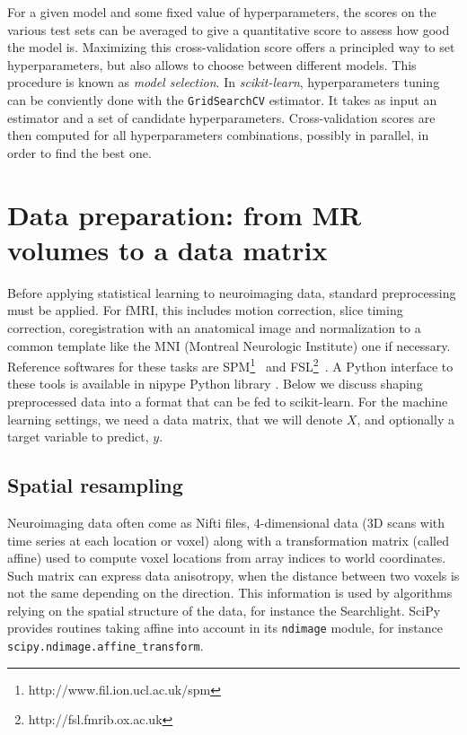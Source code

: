 \documentclass{frontiersSCNS} %
\begin{document}
For a given model and some fixed value of hyperparameters, the scores
on the various test sets can be averaged to give a quantitative score
to assess how good the model is. Maximizing this cross-validation score offers
a principled way to set hyperparameters, but also allows to choose between
different models. This procedure is known as \emph{model selection}.
%
In {\em scikit-learn}, hyperparameters tuning can be conviently done with the
\texttt{GridSearchCV} estimator. It takes as input an estimator and
a set of candidate hyperparameters. Cross-validation scores are then
computed for all hyperparameters combinations, possibly in parallel,
in order to find the best one.

\section{Data preparation: from MR volumes to a data matrix}

Before applying statistical learning to neuroimaging data, standard
preprocessing must be applied. For fMRI, this includes motion
correction, slice timing correction, coregistration with an anatomical image and normalization to a common
template like the MNI (Montreal Neurologic Institute) one if necessary.
Reference softwares for these tasks are
SPM\footnote{http://www.fil.ion.ucl.ac.uk/spm}~\citep{friston2007} and
FSL\footnote{http://fsl.fmrib.ox.ac.uk}~\citep{smith2004}. A Python
interface to these tools is available in nipype Python library
\citep{gorgolewski2011}. Below we discuss shaping preprocessed data into
a format that can be fed to scikit-learn. For the machine learning
settings, we need a data matrix, that we will denote $X$, and optionally a
target variable to predict, $y$.

\subsection{Spatial resampling}
\label{resampling}

Neuroimaging data often come as Nifti files, 4-dimensional data (3D scans
with time series at each location or voxel) along with a
transformation matrix (called affine) used to compute voxel locations
from array indices to world coordinates. Such matrix can express data
anisotropy, when the distance between two voxels is not the same
depending on the direction. This information is used by algorithms
relying on the spatial structure of the data, for instance the
Searchlight. SciPy provides routines taking affine into account in its
\texttt{ndimage} module, for instance \texttt{scipy.ndimage.affine\_transform}.
\end{document}
